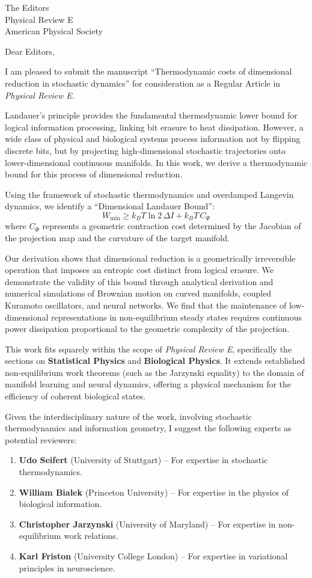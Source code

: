 \documentclass[11pt]{letter}
\begin{document}
\begin{letter}{The Editors\\Physical Review E\\American Physical Society}

\opening{Dear Editors,}

I am pleased to submit the manuscript ``Thermodynamic costs of dimensional reduction in stochastic dynamics'' for consideration as a Regular Article in \textit{Physical Review E}.

Landauer's principle provides the fundamental thermodynamic lower bound for logical information processing, linking bit erasure to heat dissipation. However, a wide class of physical and biological systems process information not by flipping discrete bits, but by projecting high-dimensional stochastic trajectories onto lower-dimensional continuous manifolds. In this work, we derive a thermodynamic bound for this process of dimensional reduction.

Using the framework of stochastic thermodynamics and overdamped Langevin dynamics, we identify a ``Dimensional Landauer Bound'':
\[
W_{\text{min}} \ge k_B T \ln 2 \, \Delta I + k_B T \, C_\Phi
\]
where $C_\Phi$ represents a geometric contraction cost determined by the Jacobian of the projection map and the curvature of the target manifold.

Our derivation shows that dimensional reduction is a geometrically irreversible operation that imposes an entropic cost distinct from logical erasure. We demonstrate the validity of this bound through analytical derivation and numerical simulations of Brownian motion on curved manifolds, coupled Kuramoto oscillators, and neural networks. We find that the maintenance of low-dimensional representations in non-equilibrium steady states requires continuous power dissipation proportional to the geometric complexity of the projection.

This work fits squarely within the scope of \textit{Physical Review E}, specifically the sections on \textbf{Statistical Physics} and \textbf{Biological Physics}. It extends established non-equilibrium work theorems (such as the Jarzynski equality) to the domain of manifold learning and neural dynamics, offering a physical mechanism for the efficiency of coherent biological states.

Given the interdisciplinary nature of the work, involving stochastic thermodynamics and information geometry, I suggest the following experts as potential reviewers:
\begin{enumerate}
\item \textbf{Udo Seifert} (University of Stuttgart) -- For expertise in stochastic thermodynamics.
\item \textbf{William Bialek} (Princeton University) -- For expertise in the physics of biological information.
\item \textbf{Christopher Jarzynski} (University of Maryland) -- For expertise in non-equilibrium work relations.
\item \textbf{Karl Friston} (University College London) -- For expertise in variational principles in neuroscience.
\end{enumerate}


\end{letter}
\end{document}
